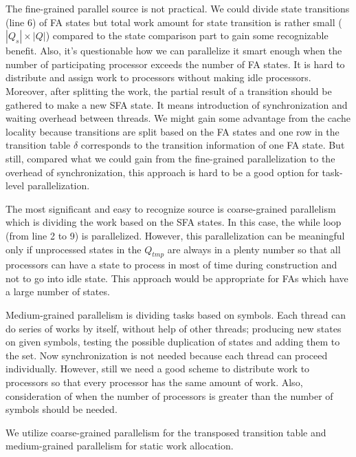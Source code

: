 \documentclass[10pt, conference, compsocconf]{IEEEtran}
\newcommand\StateSet[1][{}]{\ensuremath{Q_{#1}}}
\newcommand\StateSets{\ensuremath{Q}}
\newcommand\TF{\ensuremath{\delta}}
\begin{document}
The fine-grained parallel source is not practical. We could
divide state transitions (line 6) of FA states but total work amount
for state transition is rather small ($|\StateSet[s]|\times|\StateSets|$)
compared to the state comparison part to gain some recognizable benefit. Also, it's questionable
how we can parallelize it smart enough when the number of participating
processor exceeds the number of FA states. It is hard to distribute and
assign work to processors without making idle processors. Moreover,
after splitting the work, the partial result of a transition should be gathered
to make a new SFA state. It means introduction of synchronization and waiting overhead between
threads. We might gain some advantage from the cache locality
because transitions are split based on the FA states and one row in the transition
table $\TF$ corresponds to the transition information of one FA state.
But still, compared what we could gain from the fine-grained parallelization
to the overhead of synchronization, this approach is hard to be a good option
for task-level parallelization.

The most significant and easy to recognize source is coarse-grained
parallelism which is dividing the work based on the SFA states. In
this case, the while loop (from line 2 to 9) is parallelized. However,
this parallelization can be meaningful only if unprocessed states in
the $\StateSet[tmp]$ are always in a plenty number so that all processors
can have a state to process in most of time during construction and not to
go into idle state. This approach would be appropriate for FAs which have a large number of states.

Medium-grained parallelism is dividing tasks based on symbols.
Each thread can do series of works by itself, without help of other threads;
producing new states on given symbols, testing the possible duplication of states 
and adding them to the set. 
Now synchronization is not needed because each thread can proceed individually.
However, still we need a good scheme to distribute work to processors
so that every processor has the same amount of work. Also, consideration of when 
the number of processors is greater than the number of symbols should be needed.

We utilize coarse-grained parallelism for the transposed transition table and medium-grained parallelism for static work allocation.
\end{document}
